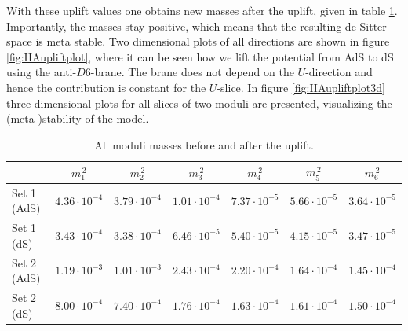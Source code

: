 \documentclass[12pt]{report}
\begin{document}
With these uplift values one obtains new masses after the uplift, given in table \ref{tab:IIAupliftmass}. Importantly, the masses stay positive, which means that the resulting de Sitter space is meta stable. Two dimensional plots of all directions are shown in figure \ref{fig:IIAupliftplot}, where it can be seen how we lift the potential from AdS to dS using the anti-$D6$-brane. The brane does not depend on the $U$-direction and hence the contribution is constant for the $U$-slice. In figure \ref{fig:IIAupliftplot3d} three dimensional plots for all slices of two moduli are presented, visualizing the (meta-)stability of the model. 

\begin{table}[H]
\center
\begin{tabular}{|l|c|c|c|c|c|c|}\hline
& $m_{1}^{\,2}$ & $m_{2}^{\,2}$  & $m_{3}^{\,2}$ & $m_{4}^{\,2}$ & $m_{5}^{\,2}$ & $m_{6}^{\,2}$ \\\hline
Set 1 (AdS) & $4.36\cdot10^{-4}$& $3.79\cdot 10^{-4}$& $1.01\cdot 10^{-4}$ & $7.37\cdot 10^{-5}$& $5.66 \cdot 10^{-5}$ & $3.64 \cdot 10^{-5}$ \\\hline
Set 1 (dS) & $3.43\cdot10^{-4}$& $3.38\cdot 10^{-4}$& $6.46\cdot 10^{-5}$ & $5.40\cdot 10^{-5}$& $4.15 \cdot 10^{-5}$ & $3.47 \cdot 10^{-5}$ \\\hline\hline
Set 2 (AdS) & $1.19 \cdot 10^{-3}$ & $1.01\cdot 10^{-3}$& $2.43 \cdot 10^{-4}$ & $2.20 \cdot 10^{-4}$& $1.64 \cdot 10^{-4}$ & $1.45\cdot 10^{-4}$  \\\hline
Set 2 (dS) & $8.00 \cdot 10^{-4}$ & $7.40 \cdot 10^{-4}$ & $1.76\cdot 10^{-4}$ & $1.63 \cdot 10^{-4}$ & $1.61 \cdot 10^{-4}$& $1.50 \cdot 10^{-4}$  \\\hline
\end{tabular}
\caption{All moduli masses before and after the uplift.} 
\label{tab:IIAupliftmass}
\end{table}
\end{document}
